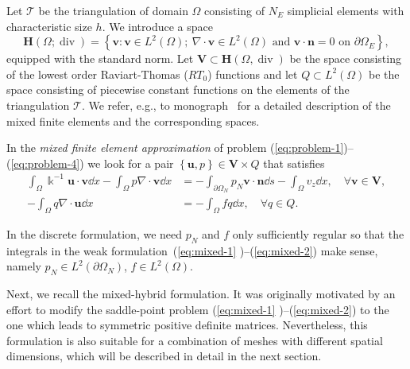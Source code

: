 Let $\mathcal{T}$ be the triangulation of domain $\Omega$ consisting of
$N_{E}$ simplicial elements with characteristic size $h$. We introduce a
space
\begin{equation}
\mathbf{H}(\Omega;\operatorname{div})=\left\{  \mathbf{v:v}\in L^{2}%
(\Omega);\ \nabla\cdot\mathbf{v}\in L^{2}(\Omega)\text{ and }\mathbf{v}%
\cdot\mathbf{n}=0\text{ on }\partial\Omega_{E}\right\}  ,
\end{equation}
equipped with the standard norm. Let $\mathbf{V}\subset\mathbf{H}%
(\Omega,\operatorname{div})$ be the space consisting of the lowest order
Raviart-Thomas ($RT_{0}$) functions and let $Q\subset L^{2}(\Omega)$ be the
space consisting of piecewise constant functions on the elements of the
triangulation $\mathcal{T}$. We refer, e.g., to 
monograph~\cite{Brezzi-1991-MHF} for a detailed description of the mixed
finite elements and the corresponding spaces.

In the \emph{mixed finite element approximation} of problem
(\ref{eq:problem-1})--(\ref{eq:problem-4}) we look for a pair $\left\{
\mathbf{u},p\right\}  \in\mathbf{V}\times Q$ that satisfies
\begin{align}
\int_{\Omega}\Bbbk^{-1}\mathbf{u}\cdot\mathbf{v}\dd x-\int_{\Omega}p\nabla
\cdot\mathbf{v}\dd x  &  =-\int_{\partial\Omega_{N}}p_{N}\mathbf{v}%
\cdot\mathbf{n}\dd s-\int_{\Omega}v_{z}\dd x,\quad\forall\mathbf{v}\in
\mathbf{V},\label{eq:mixed-1}\\
-\int_{\Omega}q\nabla\cdot\mathbf{u}\dd x  &  =-\int_{\Omega}fq\dd x,\quad
\forall q\in Q. \label{eq:mixed-2}%
\end{align}


In the discrete formulation, we need $p_{N}$ and $f$ only sufficiently regular
so that the integrals in the weak formulation~(\ref{eq:mixed-1}%
)--(\ref{eq:mixed-2}) make sense, namely $p_{N}\in L^{2}\left(  \partial
\Omega_{N}\right)  $, $f\in L^{2}\left(  \Omega\right)  $.

Next, we recall the mixed-hybrid formulation. It was originally motivated by
an effort to modify the saddle-point problem (\ref{eq:mixed-1}%
)--(\ref{eq:mixed-2}) to the one which leads to symmetric positive definite
matrices. Nevertheless, this formulation is also suitable for a combination of
meshes with different spatial dimensions, which will be described in detail in
the next section.

